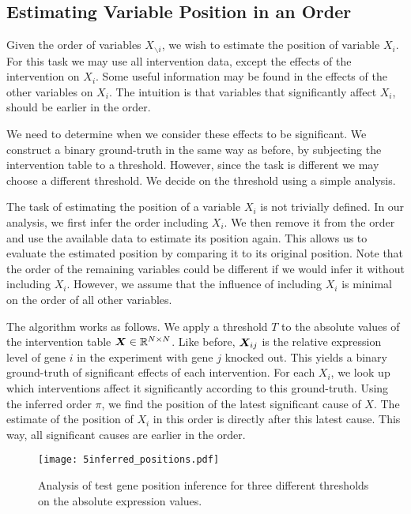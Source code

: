 \subsection{Estimating Variable Position in an Order}

Given the order of variables $X_{\backslash i}$, we wish to estimate the position of variable $X_i$. For this task we may use all intervention data, except the effects of the intervention on $X_i$. Some useful information may be found in the effects of the other variables on $X_i$. The intuition is that variables that significantly affect $X_i$, should be earlier in the order. 

We need to determine when we consider these effects to be significant. We construct a binary ground-truth in the same way as before, by subjecting the intervention table to a threshold. However, since the task is different we may choose a different threshold. We decide on the threshold using a simple analysis.

The task of estimating the position of a variable $X_i$ is not trivially defined. In our analysis, we first infer the order including $X_i$. We then remove it from the order and use the available data to estimate its position again. This allows us to evaluate the estimated position by comparing it to its original position. Note that the order of the remaining variables could be different if we would infer it without including $X_i$. However, we assume that the influence of including $X_i$ is minimal on the order of all other variables. 

The algorithm works as follows. We apply a threshold $T$ to the absolute values of the intervention table $\bm{X} \in \mathbb{R}^{N\times N}$. Like before, $\bm{X}_{ij}$ is the relative expression level of gene $i$ in the experiment with gene $j$ knocked out. This yields a binary ground-truth of significant effects of each intervention. For each $X_i$, we look up which interventions affect it significantly according to this ground-truth. Using the inferred order $\pi$, we find the position of the latest significant cause of $X$. The estimate of the position of $X_i$ in this order is directly after this latest cause. This way, all significant causes are earlier in the order.

\begin{figure}[]
    \centering
    \texttt{[image: 5inferred\_positions.pdf]}
    \caption{Analysis of test gene position inference for three different thresholds on the absolute expression values.}
    \label{fig:5:positions}
\end{figure}

